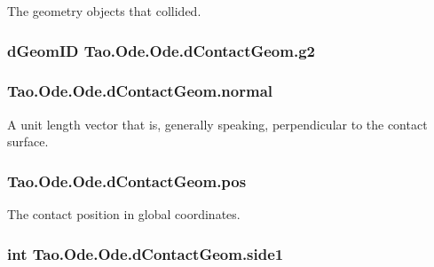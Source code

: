 The geometry objects that collided. 

\hypertarget{struct_tao_1_1_ode_1_1_ode_1_1d_contact_geom_aebc005fe750eff2bb88c1614c174b661}{
\subsubsection[{g2}]{\setlength{\rightskip}{0pt plus 5cm}dGeomID {\bf Tao.Ode.Ode.dContactGeom.g2}}}
\label{struct_tao_1_1_ode_1_1_ode_1_1d_contact_geom_aebc005fe750eff2bb88c1614c174b661}
\hypertarget{struct_tao_1_1_ode_1_1_ode_1_1d_contact_geom_af23489b991bf82f1e11363be14432f36}{
\subsubsection[{normal}]{ {\bf Tao.Ode.Ode.dContactGeom.normal}}}
\label{struct_tao_1_1_ode_1_1_ode_1_1d_contact_geom_af23489b991bf82f1e11363be14432f36}


A unit length vector that is, generally speaking, perpendicular to the contact surface. 

\hypertarget{struct_tao_1_1_ode_1_1_ode_1_1d_contact_geom_a6f79e3710102eb50d4842c2aba79d273}{
\subsubsection[{pos}]{ {\bf Tao.Ode.Ode.dContactGeom.pos}}}
\label{struct_tao_1_1_ode_1_1_ode_1_1d_contact_geom_a6f79e3710102eb50d4842c2aba79d273}


The contact position in global coordinates. 

\hypertarget{struct_tao_1_1_ode_1_1_ode_1_1d_contact_geom_aaad9bfffdc405228cff24dd2758dbb6a}{
\subsubsection[{side1}]{\setlength{\rightskip}{0pt plus 5cm}int {\bf Tao.Ode.Ode.dContactGeom.side1}}}
\label{struct_tao_1_1_ode_1_1_ode_1_1d_contact_geom_aaad9bfffdc405228cff24dd2758dbb6a}


